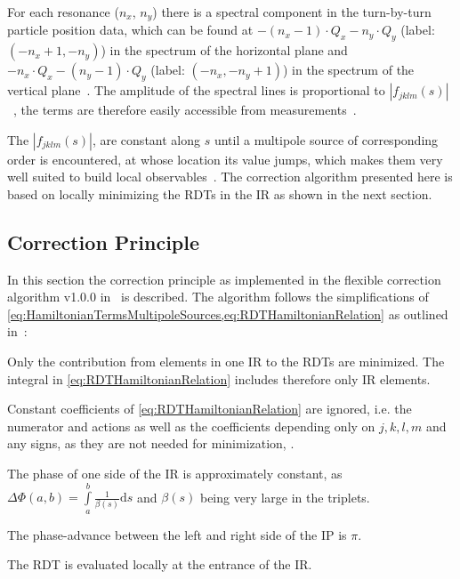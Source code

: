 For each resonance ($n_x$, $n_y$) there is a  spectral component in the turn-by-turn particle position data,
which can be found at $-(n_x-1) \cdot Q_x - n_y \cdot Q_y$ (label: $(-n_x+1, -n_y)$) in the spectrum of the horizontal plane 
and $-n_x \cdot Q_x - (n_y - 1) \cdot Q_y$ (label: $(-n_x, -n_y+1)$) in the spectrum of the vertical plane~\cite{FranchiStudiesMeasurementsLinear2006}.
The amplitude of the spectral lines is proportional to $\left| f_{jklm} (s) \right|$~\cite{FranchiStudiesMeasurementsLinear2006},
the terms are therefore easily accessible from measurements~\cite{SchmidtMeasurementDrivingTerms2001,TomasDirectMeasurementResonance2003,TomasMeasurementGlobalLocal2005,FranchiFirstSimultaneousMeasurement2014,CarlierObservationsResonanceDriving2016}.

The $|f_{jklm}(s)|$, are constant along $s$ until a multipole source of corresponding order is encountered,
at whose location its value jumps, which makes them very well suited to build local observables~\cite{TomasMeasurementGlobalLocal2005}.
The correction algorithm presented here is based on locally minimizing the RDTs in the IR as shown in the next section. 

\subsection{Correction Principle}
\label{sec:CorrectionPrinciple}
 
In this section the correction principle as implemented in
the flexible correction algorithm v1.0.0 in~\cite{OMC-TeamIRNLRDTCorrection} is described.
The algorithm follows the simplifications of \cref{eq:HamiltonianTermsMultipoleSources,eq:RDTHamiltonianRelation} 
as outlined in~\cite{BruningDynamicApertureStudies2004}:

\begin{mytemize}
    \item Only the contribution from elements in one IR to the RDTs are minimized.
          The integral in \cref{eq:RDTHamiltonianRelation} includes therefore only IR elements.
    \item Constant coefficients of \cref{eq:RDTHamiltonianRelation} are ignored, 
          i.e. the numerator and actions as well as the coefficients depending only on $j,k,l,m$ and any signs,
          as they are not needed for minimization, .
    \item The phase of one side of the IR is approximately constant, as \\
          $\Delta \Phi(a,b) = \int\limits_a^b \frac{1}{\beta(s)} \mathrm{d}s$  
          and $\beta(s)$ being very large in the triplets. 
    \item The phase-advance between the left and right side of the IP is $\pi$. 
    \item The RDT is evaluated locally at the entrance of the IR. 
\end{mytemize}

